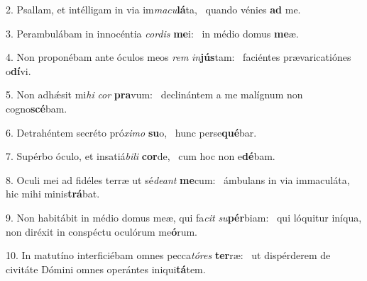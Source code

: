 2. Psallam, et intélligam in via im\textit{ma}\textit{cu}\textbf{lá}ta, \ast\  quando vénies \textbf{ad} me.\

3. Perambulábam in innocéntia \textit{cor}\textit{dis} \textbf{me}i: \ast\  in médio domus \textbf{me}æ.\

4. Non proponébam ante óculos meos \textit{rem} \textit{in}\textbf{jús}tam: \ast\  faciéntes prævaricatiónes o\textbf{dí}vi.\

5. Non adhǽsit mi\textit{hi} \textit{cor} \textbf{pra}vum: \ast\  declinántem a me malígnum non cogno\textbf{scé}bam.\

6. Detrahéntem secréto pró\textit{xi}\textit{mo} \textbf{su}o, \ast\  hunc perse\textbf{qué}bar.\

7. Supérbo óculo, et insatiá\textit{bi}\textit{li} \textbf{cor}de, \ast\  cum hoc non e\textbf{dé}bam.\

8. Oculi mei ad fidéles terræ ut sé\textit{de}\textit{ant} \textbf{me}cum: \ast\  ámbulans in via immaculáta, hic mihi minis\textbf{trá}bat.\

9. Non habitábit in médio domus meæ, qui fa\textit{cit} \textit{su}\textbf{pér}biam: \ast\  qui lóquitur iníqua, non diréxit in conspéctu oculórum me\textbf{ó}rum.\

10. In matutíno interficiébam omnes pecca\textit{tó}\textit{res} \textbf{ter}ræ: \ast\  ut dispérderem de civitáte Dómini omnes operántes iniqui\textbf{tá}tem.\

